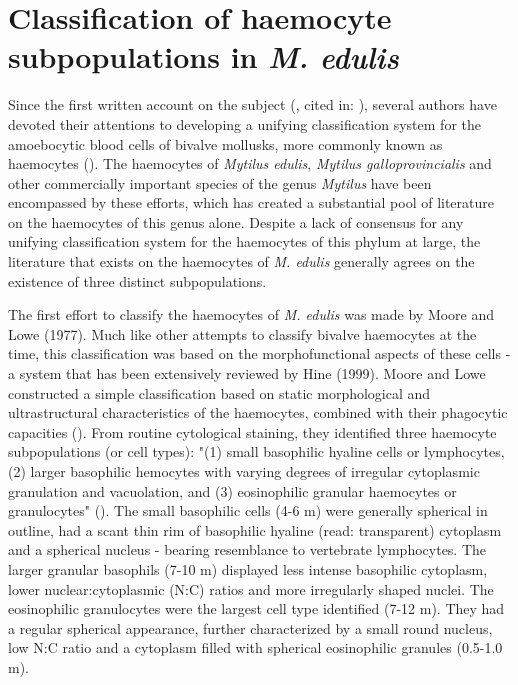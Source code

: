 \section{Classification of haemocyte subpopulations in \emph{M. edulis}}
\label{subsection:haemocyte_classification}
Since the first written account on the subject (\cite{Cuenot1891}, cited in: \cite{Cheng1980}), several authors have devoted their attentions to developing a unifying classification system for the amoebocytic blood cells of bivalve mollusks, more commonly known as haemocytes (\cite{Cheng1980, delaBallina2022}). The haemocytes of \emph{Mytilus edulis}, \emph{Mytilus galloprovincialis} and other commercially important species of the genus \emph{Mytilus} have been encompassed by these efforts, which has created a substantial pool of literature on the haemocytes of this genus alone. Despite a lack of consensus for any unifying classification system for the haemocytes of this phylum at large, the literature that exists on the haemocytes of \emph{M. edulis} generally agrees on the existence of three distinct subpopulations.

The first effort to classify the haemocytes of \emph{M. edulis} was made by Moore and Lowe (1977). Much like other attempts to classify bivalve haemocytes at the time, this classification was based on the morphofunctional aspects of these cells - a system that has been extensively reviewed by Hine (1999). Moore and Lowe constructed a simple classification based on static morphological and ultrastructural characteristics of the haemocytes, combined with their phagocytic capacities (\cite{Moore1977}). From routine cytological staining, they identified three haemocyte subpopulations (or cell types): "(1) small basophilic hyaline cells or lymphocytes, (2) larger basophilic hemocytes with varying degrees of irregular cytoplasmic granulation and vacuolation, and (3) eosinophilic granular haemocytes or granulocytes" (\cite{Moore1977}). The small basophilic cells (4-6 \micro m) were generally spherical in outline, had a scant thin rim of basophilic hyaline (read: transparent) cytoplasm and a spherical nucleus - bearing resemblance to vertebrate lymphocytes. The larger granular basophils (7-10 \micro m) displayed less intense basophilic cytoplasm, lower nuclear:cytoplasmic (N:C) ratios and more irregularly shaped nuclei. The eosinophilic granulocytes were the largest cell type identified (7-12 \micro m). They had a regular spherical appearance, further characterized by a small round nucleus, low N:C ratio and a cytoplasm filled with spherical eosinophilic granules (0.5-1.0 \micro m).

